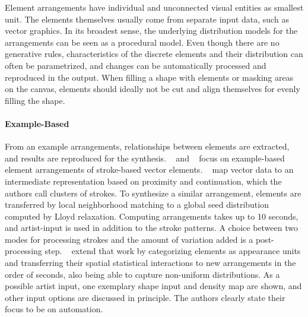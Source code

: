 Element arrangements have individual and unconnected visual entities as smallest unit. The elements themselves usually come from separate input data, such as vector graphics. In its broadest sense, the underlying distribution models for the arrangements can be seen as a procedural model. Even though there are no generative rules, characteristics of the discrete elements and their distribution can often be parametrized, and changes can be automatically processed and reproduced in the output. When filling a shape with elements or masking areas on the canvas, elements should ideally not be cut and align themselves for evenly filling the shape.

\paragraph*{Example-Based}
\label{para:analysis_element_arrangements_example}

From an example arrangements, relationships between elements are extracted, and results are reproduced for the synthesis. \citeauthor*{barla_2006_spa}~\cite{barla_2006_spa} and \citeauthor*{hurtut_2009_ags}~\cite{hurtut_2009_ags} focus on example-based element arrangements of stroke-based vector elements. \citeauthor*{barla_2006_spa}~\cite{barla_2006_spa} map vector data to an intermediate representation based on proximity and continuation, which the authors call clusters of strokes. To synthesize a similar arrangement, elements are transferred by local neighborhood matching to a global seed distribution computed by Lloyd relaxation. Computing arrangements takes up to 10 seconds, and artist-input is used in addition to the stroke patterns. A choice between two modes for processing strokes and the amount of variation added is a post-processing step. \citeauthor*{hurtut_2009_ags}~\cite{hurtut_2009_ags} extend that work by categorizing elements as appearance units and transferring their spatial statistical interactions to new arrangements in the order of seconds, also being able to capture non-uniform distributions. As a possible artist input, one exemplary shape input and density map are shown, and other input options are discussed in principle. The authors clearly state their focus to be on automation.

